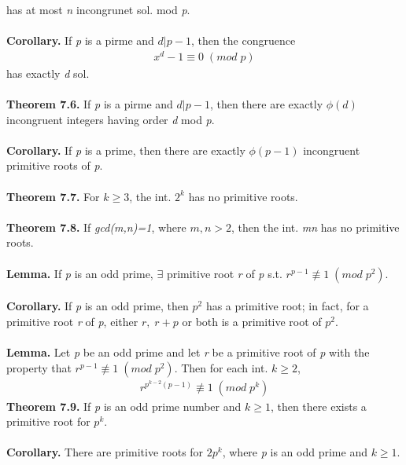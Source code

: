 \documentclass[a4paper,10pt]{article}
\begin{document}
has at most \textit{n} incongrunet sol. mod \textit{p}. \\ \\
\textbf{Corollary.} If \textit{p} is a pirme and \textit{$d|p-1$}, then the congruence
\begin{align}
x^{d}-1\equiv0 \; (mod \; p)
\end{align}
has exactly \textit{d} sol. \\ \\
\textbf{Theorem 7.6.} If \textit{p} is a pirme and \textit{$d|p-1$}, then there are exactly \textit{$\phi(d)$} incongruent integers having order \textit{d} mod \textit{p}. \\ \\
\textbf{Corollary.}  If \textit{p} is a prime, then there are exactly \textit{$\phi(p-1)$} incongruent primitive roots of \textit{p}. \\ \\
\textbf{Theorem 7.7.} For \textit{$k\geq3$}, the int. \textit{$2^{k}$} has no primitive roots. \\ \\
\textbf{Theorem 7.8.} If \textit{gcd(m,n)=1}, where \textit{$m,n>2$}, then the int. \textit{mn} has no primitive roots. \\ \\
\textbf{Lemma.} If \textit{p} is an odd prime, $\exists$ primitive root \textit{r} of \textit{p} s.t. \textit{$r^{p-1}\not\equiv1 \; (mod \; p^{2})$}. \\ \\
\textbf{Corollary.} If \textit{p} is an odd prime, then \textit{$p^{2}$} has a primitive root; in fact, for a primitive root \textit{r} of \textit{p}, either \textit{$r, \; r+p$} or both is a primitive root of \textit{$p^{2}$}. \\ \\
\textbf{Lemma.} Let \textit{p} be an odd prime and let \textit{r} be a primitive root of \textit{p} with the property that \textit{$r^{p-1}\not\equiv1 \; (mod \; p^{2})$}. Then for each int. \textit{$k\geq2$},
\begin{align}
r^{p^{k-2}(p-1)}\not\equiv1 \; (mod \; p^{k})
\end{align}
\textbf{Theorem 7.9.} If \textit{p} is an odd prime number and \textit{$k\geq1$}, then there exists a primitive root for \textit{$p^{k}$}. \\ \\
\textbf{Corollary.} There are primitive roots for \textit{$2p^{k}$}, where \textit{p} is an odd prime and \textit{$k\geq1$}. \\ \\
\end{document}
